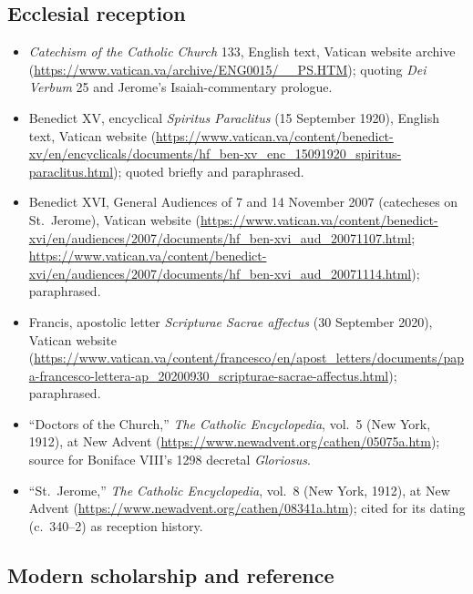 \subsection*{Ecclesial reception}

\begin{itemize}
\item \textit{Catechism of the Catholic Church} 133, English text, Vatican
website archive (\url{https://www.vatican.va/archive/ENG0015/__PS.HTM});
quoting \textit{Dei Verbum} 25 and Jerome's Isaiah-commentary prologue.
\item Benedict XV, encyclical \textit{Spiritus Paraclitus} (15 September
1920), English text, Vatican website
(\url{https://www.vatican.va/content/benedict-xv/en/encyclicals/documents/hf_ben-xv_enc_15091920_spiritus-paraclitus.html});
quoted briefly and paraphrased.
\item Benedict XVI, General Audiences of 7 and 14 November 2007 (catecheses
on St.~Jerome), Vatican website
(\url{https://www.vatican.va/content/benedict-xvi/en/audiences/2007/documents/hf_ben-xvi_aud_20071107.html};
\url{https://www.vatican.va/content/benedict-xvi/en/audiences/2007/documents/hf_ben-xvi_aud_20071114.html});
paraphrased.
\item Francis, apostolic letter \textit{Scripturae Sacrae affectus}
(30 September 2020), Vatican website
(\url{https://www.vatican.va/content/francesco/en/apost_letters/documents/papa-francesco-lettera-ap_20200930_scripturae-sacrae-affectus.html});
paraphrased.
\item ``Doctors of the Church,'' \textit{The Catholic Encyclopedia}, vol.~5
(New York, 1912), at New Advent
(\url{https://www.newadvent.org/cathen/05075a.htm}); source for Boniface
VIII's 1298 decretal \textit{Gloriosus}.
\item ``St.~Jerome,'' \textit{The Catholic Encyclopedia}, vol.~8 (New York,
1912), at New Advent (\url{https://www.newadvent.org/cathen/08341a.htm});
cited for its dating (c.~340--2) as reception history.
\end{itemize}

\subsection*{Modern scholarship and reference}

